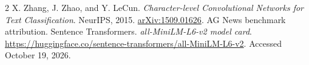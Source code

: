 \documentclass[10pt,letterpaper]{article}
\begin{document}
\vspace{-3pt}
\begin{thebibliography}{2}
\setlength{\itemsep}{-1pt}\setlength{\parskip}{0pt}\footnotesize
{} X. Zhang, J. Zhao, and Y. LeCun. \emph{Character-level Convolutional Networks for Text Classification}. NeurIPS, 2015. \href{https://arxiv.org/abs/1509.01626}{arXiv:1509.01626}. AG News benchmark attribution.
 Sentence Transformers. \emph{all-MiniLM-L6-v2 model card}. \url{https://huggingface.co/sentence-transformers/all-MiniLM-L6-v2}. Accessed October 19, 2026.
\end{thebibliography}
\end{document}
